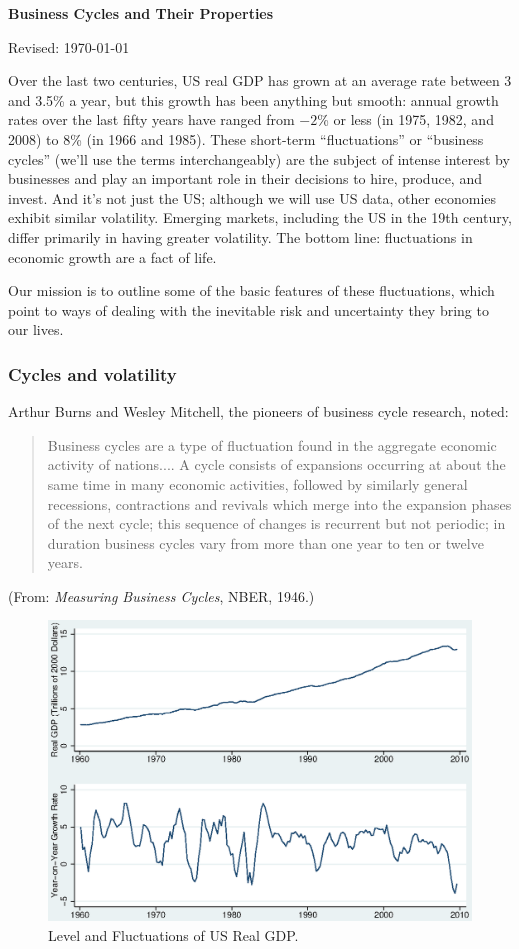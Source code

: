 \documentclass[letterpaper,12pt]{article}
\def\HeadName{Business Cycles and Their Properties}
\begin{document}
\thispagestyle{empty}%
\Head

\centerline{\large \bf \HeadName}%
\centerline{Revised: \today}

\bigskip
Over the last two centuries, US real GDP has grown at an average
rate between 3 and 3.5\% a year,
but this growth has been anything but smooth:
annual growth rates over the last fifty years have
ranged from $-2$\% or less (in 1975, 1982, and 2008)
to 8\% (in 1966 and 1985).
These short-term ``fluctuations'' or ``business cycles''
(we'll use the terms interchangeably)
are the subject of intense interest by businesses
and play an important role in their decisions to hire, produce, and invest.
And it's not just the US;
although we will use US data, other economies exhibit similar
volatility.
Emerging markets, including the US in the 19th century,
differ primarily in having greater volatility.
The bottom line:  fluctuations in economic growth
are a fact of life.

Our mission is to outline some of the basic features
of these fluctuations, which point to ways of dealing with
the inevitable risk and uncertainty they bring to our lives.


\subsubsection*{Cycles and volatility}

Arthur Burns and Wesley Mitchell, the pioneers of business cycle research,
noted:  
%
\begin{quote}
{Business cycles are a type of
fluctuation found in the aggregate economic activity of
nations.... A cycle consists of expansions occurring at about the
same time in many economic activities, followed by similarly
general recessions, contractions and revivals which merge into the
expansion phases of the next cycle; this sequence of changes is
recurrent but not periodic; in duration business cycles vary from
more than one year to ten or twelve years.}
\end{quote}
(From: {\it Measuring Business Cycles\/}, NBER, 1946.)

\begin{figure}[h]
    \centering
    \includegraphics[scale=0.8]{usygy.eps}
    \caption{Level and Fluctuations of US Real GDP.}
    \label{fig:yandgy}
\end{figure}
\end{document}

